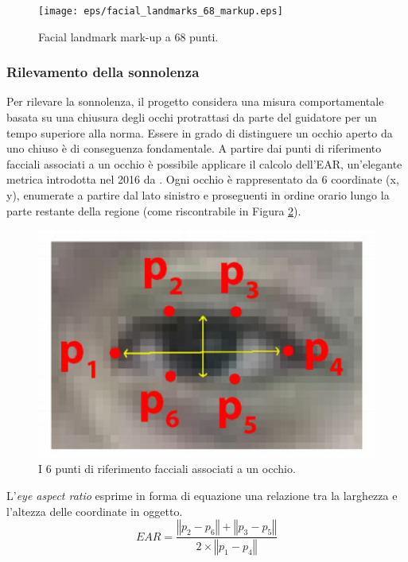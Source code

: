 \documentclass[12pt]{article}
\begin{document}
\begin{figure}[!htb]
	\centering
	\texttt{[image: eps/facial\_landmarks\_68\_markup.eps]}
	\caption{Facial landmark mark-up a 68 punti.}
	\label{fig:facial_landmarks_68_markup}
\end{figure}

\subsubsection{Rilevamento della sonnolenza}
\label{subsubsec:ear}

Per rilevare la sonnolenza, il progetto considera una misura comportamentale basata su una chiusura degli occhi protrattasi da parte del guidatore per un tempo superiore alla norma. Essere in grado di distinguere un occhio aperto da uno chiuso è di conseguenza fondamentale. A partire dai punti di riferimento facciali associati a un occhio è possibile applicare il calcolo dell'EAR, un'elegante metrica introdotta nel 2016 da \cite{EAR}.
Ogni occhio è rappresentato da 6 coordinate (x, y), enumerate a partire dal lato sinistro e proseguenti in ordine orario lungo la parte restante della regione (come riscontrabile in Figura \ref{fig:eye_6_landmarks}).
\begin{figure}[!htb]
	\centering
	\includegraphics[scale=0.35]{eps/eye_6_landmarks.eps}
	\caption{I 6 punti di riferimento facciali associati a un occhio.}
	\label{fig:eye_6_landmarks}
\end{figure}
L'\textit{eye aspect ratio} esprime in forma di equazione una relazione tra la larghezza e l'altezza delle coordinate in oggetto.
\begin{equation}
EAR = \frac{\left\Vert{p_2 - p_6}\right\Vert + \left\Vert{p_3 - p_5}\right\Vert}{2 \times {\left\Vert{p_1 - p_4}\right\Vert}}
\end{equation}
\end{document}
